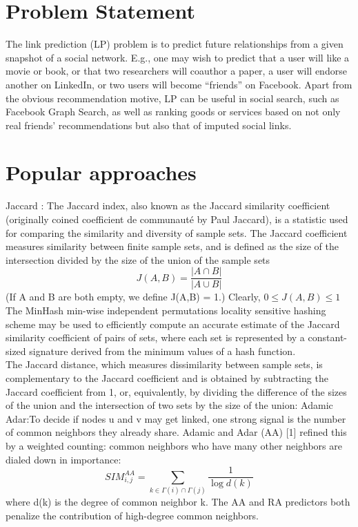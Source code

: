 \clearpage

\section*{Problem Statement}
The link prediction (LP) problem is to predict future relationships from a given snapshot of a social network. E.g., one may wish to predict that a user will like a movie or book, or that two researchers will coauthor a paper, a user will endorse another on LinkedIn, or two users will become “friends” on Facebook. Apart from the obvious recommendation motive, LP can be useful in social search, such as Facebook Graph Search, as well as ranking goods or services based on not only real friends’ recommendations but also that of imputed social links.

\section*{Popular approaches}
Jaccard : The Jaccard index, also known as the Jaccard similarity coefficient (originally coined coefficient de communauté by Paul Jaccard), is a statistic used for comparing the similarity and diversity of sample sets. The Jaccard coefficient measures similarity between finite sample sets, and is defined as the size of the intersection divided by the size of the union of the sample sets
\begin{equation}
J(A,B) = \frac{\left\vert A \cap B \right\vert}{\left\vert A \cup B \right\vert}
\end{equation}
(If A and B are both empty, we define J(A,B) = 1.) Clearly,
$0 \leq J(A,B) \leq 1$
The MinHash min-wise independent permutations locality sensitive hashing scheme may be used to efficiently compute an accurate estimate of the Jaccard similarity coefficient of pairs of sets, where each set is represented by a constant-sized signature derived from the minimum values of a hash function.\\
The Jaccard distance, which measures dissimilarity between sample sets, is complementary to the Jaccard coefficient and is obtained by subtracting the Jaccard coefficient from 1, or, equivalently, by dividing the difference of the sizes of the union and the intersection of two sets by the size of the union:
Adamic Adar:To decide if nodes u and v may get linked, one strong signal is the number of common neighbors they already share. Adamic and Adar (AA) [1] refined this by a weighted counting: common neighbors who have many other neighbors are dialed down in importance:
\begin{equation}
SIM_{i,j}^{AA} = \sum_{k \in \Gamma(i) \cap \Gamma(j)} \frac{1}{\log {d(k)}}
\end{equation}
where d(k) is the degree of common neighbor k. The AA and RA predictors both penalize the contribution of high-degree common neighbors.


